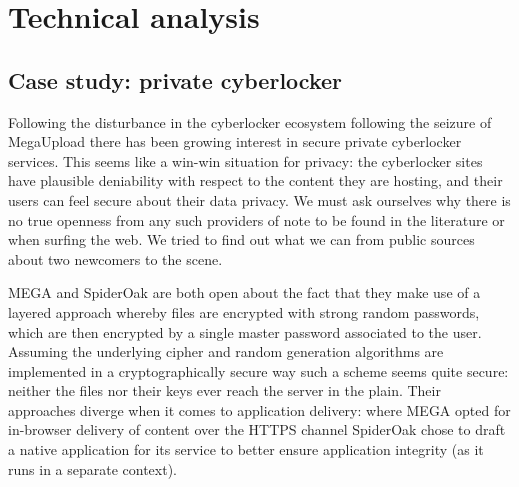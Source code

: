 \documentclass[11pt]{article}
\begin{document}
\section{Technical analysis}
\label{sec:technical_analysis}





\subsection{Case study: private cyberlocker}
\label{sec:cyberlocker}
%
Following the disturbance in the cyberlocker ecosystem following the seizure of MegaUpload there has been growing interest in secure private cyberlocker services.
This seems like a win-win situation for privacy: the cyberlocker sites have plausible deniability with respect to the content they are hosting, and their users can feel secure about their data privacy.
We must ask ourselves why there is no true openness from any such providers of note to be found in the literature or when surfing the web. \cite{borgmann2012security}
We tried to find out what we can from public sources about two newcomers to the scene.

MEGA and SpiderOak are both open about the fact that they make use of a layered approach whereby files are encrypted with strong random passwords, which are then encrypted by a single master password associated to the user.
Assuming the underlying cipher and random generation algorithms are implemented in a cryptographically secure way such a scheme seems quite secure: neither the files nor their keys ever reach the server in the plain.
Their approaches diverge when it comes to application delivery: where MEGA opted for in-browser delivery of content over the HTTPS channel SpiderOak chose to draft a native application for its service to better ensure application integrity (as it runs in a separate context).
\end{document}
